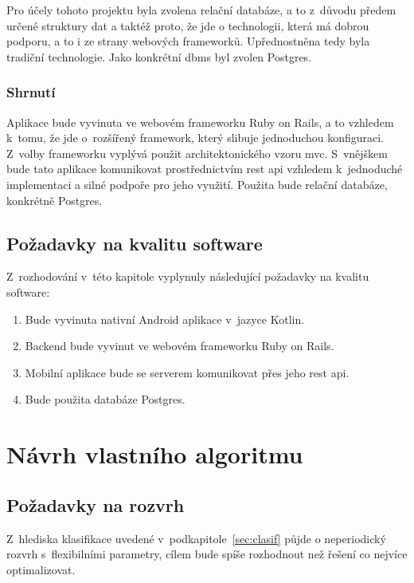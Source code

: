 \documentclass[twoside]{ctuthesis}
\begin{document}
Pro účely tohoto projektu byla zvolena relační databáze, a to z~důvodu předem určené struktury dat a taktéž proto, že jde o technologii, která má dobrou podporu, a to i ze strany webových frameworků. Upřednostněna tedy byla tradiční technologie. Jako konkrétní \acrshort{dbms} byl zvolen Postgres.


\subsection{Shrnutí}

Aplikace bude vyvinuta ve webovém frameworku Ruby on Rails, a to vzhledem k~tomu, že jde o~rozšířený framework, který slibuje jednoduchou konfiguraci. Z~volby frameworku vyplývá použit architektonického vzoru \acrshort{mvc}. S~vnějškem bude tato aplikace komunikovat prostřednictvím \acrshort{rest} \acrshort{api} vzhledem k~jednoduché implementaci a silné podpoře pro jeho využití. Použita bude relační databáze, konkrétně Postgres.

\section{Požadavky na kvalitu software}

Z~rozhodování v~této kapitole vyplynuly následující požadavky na kvalitu software:

\begin{enumerate}[label=\textbf{S\arabic*.}]
	\item Bude vyvinuta nativní Android aplikace v~jazyce Kotlin.
	\item Backend bude vyvinut ve webovém frameworku Ruby on Rails.
	\item Mobilní aplikace bude se serverem komunikovat přes jeho \acrshort{rest} \acrshort{api}.
	\item Bude použita databáze Postgres.
\end{enumerate}

\chapter{Návrh vlastního algoritmu}

\section{Požadavky na rozvrh}

Z~hlediska klasifikace uvedené v~podkapitole~\ref{sec:clasif} půjde o neperiodický rozvrh s~flexibilními parametry, cílem bude spíše rozhodnout než řešení co nejvíce optimalizovat.
\end{document}
